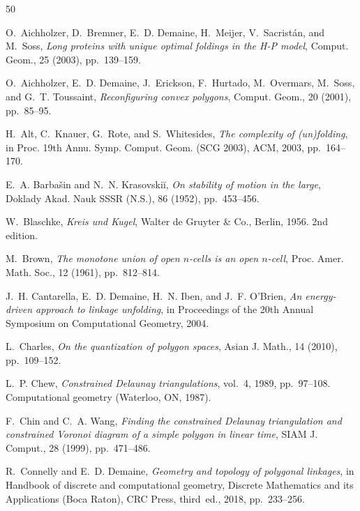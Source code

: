 \documentclass[11pt,letterpaper]{amsart}
\theoremstyle{plain}
\theoremstyle{definition}
\theoremstyle{remark}
\numberwithin{equation}{section}
\begin{document}
\begin{thebibliography}{50}

{\sc O.~Aichholzer, D.~Bremner, E.~D. Demaine, H.~Meijer, V.~Sacrist\'an, and
  M.~Soss}, {\em Long proteins with unique optimal foldings in the {H}-{P}
  model}, Comput. Geom., 25 (2003), pp.~139--159.

{\sc O.~Aichholzer, E.~D. Demaine, J.~Erickson, F.~Hurtado, M.~Overmars,
  M.~Soss, and G.~T. Toussaint}, {\em Reconfiguring convex polygons}, Comput.
  Geom., 20 (2001), pp.~85--95.

{\sc H.~Alt, C.~Knauer, G.~Rote, and S.~Whitesides}, {\em The complexity of
  (un)folding}, in Proc. 19th Annu. Symp. Comput. Geom. (SCG 2003), ACM, 2003,
  pp.~164--170.

{\sc E.~A. Barba\v{s}in and N.~N. Krasovski\u{i}}, {\em On stability of motion
  in the large}, Doklady Akad. Nauk SSSR (N.S.), 86 (1952), pp.~453--456.

{\sc W.~Blaschke}, {\em Kreis und {K}ugel}, Walter de Gruyter \& Co., Berlin,
  1956.
\newblock 2nd edition.

{\sc M.~Brown}, {\em The monotone union of open {$n$}-cells is an open
  {$n$}-cell}, Proc. Amer. Math. Soc., 12 (1961), pp.~812--814.

{\sc J.~H. Cantarella, E.~D. Demaine, H.~N. Iben, and J.~F. O'Brien}, {\em An
  energy-driven approach to linkage unfolding}, in Proceedings of the 20th
  Annual Symposium on Computational Geometry, 2004.

{\sc L.~Charles}, {\em On the quantization of polygon spaces}, Asian J. Math.,
  14 (2010), pp.~109--152.

{\sc L.~P. Chew}, {\em Constrained Delaunay triangulations}, vol.~4, 1989,
  pp.~97--108.
\newblock Computational geometry (Waterloo, ON, 1987).

{\sc F.~Chin and C.~A. Wang}, {\em Finding the constrained {D}elaunay
  triangulation and constrained {V}oronoi diagram of a simple polygon in linear
  time}, SIAM J. Comput., 28 (1999), pp.~471--486.

{\sc R.~Connelly and E.~D. Demaine}, {\em Geometry and topology of polygonal
  linkages}, in Handbook of discrete and computational geometry, Discrete
  Mathematics and its Applications (Boca Raton), CRC Press, third~ed., 2018,
  pp.~233--256.


\end{thebibliography}
\end{document}
